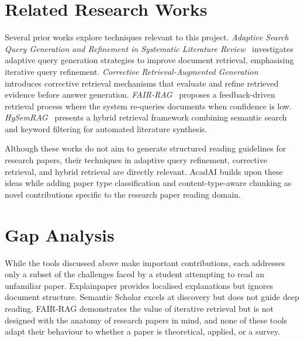 \documentclass[12pt,a4paper]{report}
\begin{document}

\section{Related Research Works}

Several prior works explore techniques relevant to this project.
\textit{Adaptive Search Query Generation and Refinement in Systematic Literature
Review}~\cite{badami2023} investigates adaptive query generation strategies to
improve document retrieval, emphasising iterative query refinement.
\textit{Corrective Retrieval-Augmented Generation}~\cite{yan2024} introduces
corrective retrieval mechanisms that evaluate and refine retrieved evidence
before answer generation. \textit{FAIR-RAG}~\cite{asl2024fair} proposes a
feedback-driven retrieval process where the system re-queries documents when
confidence is low. \textit{HySemRAG}~\cite{godinez2025} presents a hybrid
retrieval framework combining semantic search and keyword filtering for
automated literature synthesis.

Although these works do not aim to generate structured reading guidelines for
research papers, their techniques in adaptive query refinement, corrective
retrieval, and hybrid retrieval are directly relevant. AcadAI builds upon these
ideas while adding paper type classification and content-type-aware chunking as
novel contributions specific to the research paper reading domain.

\section{Gap Analysis}

While the tools discussed above make important contributions, each addresses
only a subset of the challenges faced by a student attempting to read an
unfamiliar paper. Explainpaper provides localised explanations but ignores
document structure. Semantic Scholar excels at discovery but does not guide deep
reading. FAIR-RAG demonstrates the value of iterative retrieval but is not
designed with the anatomy of research papers in mind, and none of these tools
adapt their behaviour to whether a paper is theoretical, applied, or a survey.
\end{document}
